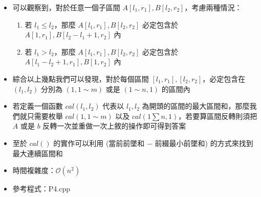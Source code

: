 \documentclass[aspectratio=169]{beamer}
\begin{document}
    \begin{frame}
    		\begin{itemize}
    			\item 可以觀察到，對於任意一個子區間 $A[l_1, r_1], B[l_2, r_2]$，考慮兩種情況：
    			\begin{enumerate}
    				\item 若 $l_1 \le l_2$，那麼 $A[l_1, r_1], B[l_2, r_2]$ 必定包含於 $A[1, r_1], B[l_2-l_1+1, r_2]$ 內
				\item 若 $l_1 > l_2$，那麼 $A[l_1, r_1], B[l_2, r_2]$ 必定包含於 $A[l_1-l_2+1, r_1], B[1, r_2]$ 內
    			\end{enumerate}
    			
    			\item 綜合以上幾點我們可以發現，對於每個區間 $[l_1, r_1], [l_2, r_2]$，必定包含在 $(l_1, l_2)$ 分別為 $(1, 1\sim m)$ 或是 $(1\sim n, 1)$ 的區間內
    			\item 若定義一個函數 $cal(l_1, l_2)$ 代表以 $l_1, l_2$ 為開頭的區間的最大區間和，那麼我們就只需要枚舉 $cal(1, 1\sim m)$ 以及 $cal(1\sum n, 1)$，若要算區間反轉則須把 $A$ 或是 $b$ 反轉一次並重做一次上敘的操作即可得到答案
    			\item 至於 $cal()$ 的實作可以利用 (當前前墜和 $-$ 前綴最小前墜和) 的方式來找到最大連續區間和
    			\item 時間複雜度：$\mathcal{O}(n^2)$
    			\item 參考程式：P4.cpp
    		\end{itemize}
    \end{frame}
\end{document}
